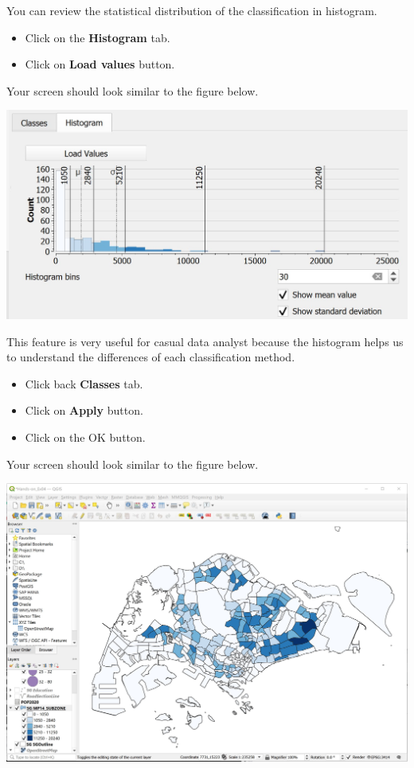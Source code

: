 \documentclass[
  letterpaper,
  DIV=11,
  numbers=noendperiod]{scrreprt}
\providecommand{\tightlist}{%
  \setlength{\itemsep}{0pt}\setlength{\parskip}{0pt}}\usepackage{longtable,booktabs,array}
\begin{document}
You can review the statistical distribution of the classification in
histogram.

\begin{itemize}
\tightlist
\item
  Click on the \textbf{Histogram} tab.
\item
  Click on \textbf{Load values} button.
\end{itemize}

Your screen should look similar to the figure below.

\includegraphics{./img03/image35.jpg}

This feature is very useful for casual data analyst because the
histogram helps us to understand the differences of each classification
method.

\begin{itemize}
\tightlist
\item
  Click back \textbf{Classes} tab.
\item
  Click on \textbf{Apply} button.
\item
  Click on the OK button.
\end{itemize}

Your screen should look similar to the figure below.

\includegraphics{./img03/image36.jpg}
\end{document}

